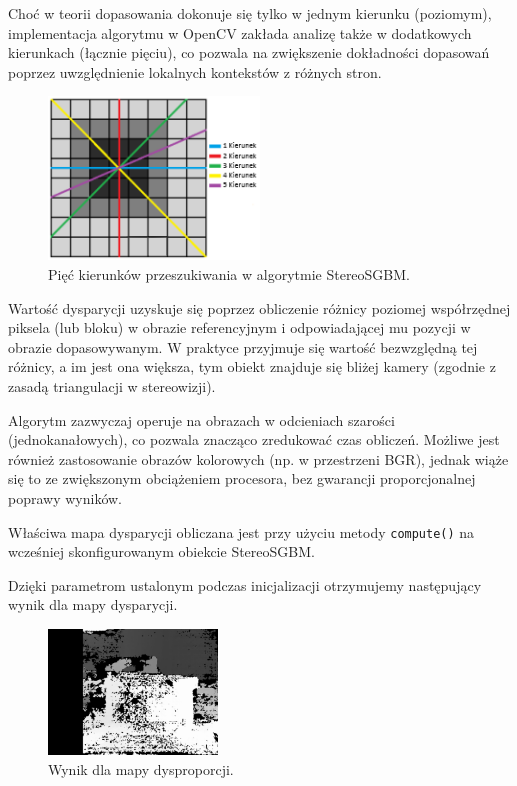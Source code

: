 \documentclass[magisterska]{pracadypl}
\begin{document}
Choć w teorii dopasowania dokonuje się tylko w jednym kierunku (poziomym), implementacja algorytmu w OpenCV zakłada analizę także w dodatkowych kierunkach (łącznie pięciu), co pozwala na zwiększenie dokładności dopasowań poprzez uwzględnienie lokalnych kontekstów z różnych stron.

\begin{figure}[H]
\centering
\includegraphics[width=0.5\textwidth]{images/dopracy2.png}
\captionsetup{font=footnotesize}
\caption[Pięć kierunków przeszukiwania w algorytmie StereoSGBM. Opracowanie własne.]{Pięć kierunków przeszukiwania w algorytmie StereoSGBM.}
\end{figure}

Wartość dysparycji uzyskuje się poprzez obliczenie różnicy poziomej współrzędnej piksela (lub bloku) w obrazie referencyjnym i odpowiadającej mu pozycji w obrazie dopasowywanym. W praktyce przyjmuje się wartość bezwzględną tej różnicy, a im jest ona większa, tym obiekt znajduje się bliżej kamery (zgodnie z zasadą triangulacji w stereowizji).

Algorytm zazwyczaj operuje na obrazach w odcieniach szarości (jednokanałowych), co pozwala znacząco zredukować czas obliczeń. Możliwe jest również zastosowanie obrazów kolorowych (np. w przestrzeni BGR), jednak wiąże się to ze zwiększonym obciążeniem procesora, bez gwarancji proporcjonalnej poprawy wyników.

Właściwa mapa dysparycji obliczana jest przy użyciu metody \texttt{compute()} na wcześniej skonfigurowanym obiekcie StereoSGBM.

Dzięki parametrom ustalonym podczas inicjalizacji otrzymujemy następujący wynik dla mapy dysparycji.

\begin{figure}[H]  %
    \centering  %
    \includegraphics[width=0.4\textwidth]{images/dopracy3.png}  %
    \captionsetup{font=footnotesize}
    \caption[Wynik dla mapy dysproporcji. Opracowanie własne.]{Wynik dla mapy dysproporcji.}
\end{figure}
\end{document}
